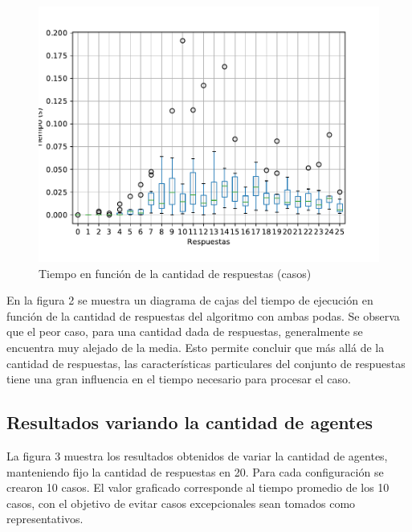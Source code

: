\documentclass{article}
\begin{document}
\begin{figure}[h]
\caption{Tiempo en función de la cantidad de respuestas (casos)}
\centering
\includegraphics[scale=0.5]{Respuestas_box_st.pdf}
\end{figure}

En la figura 2 se muestra un diagrama de cajas del tiempo de ejecución en función de la cantidad de respuestas del algoritmo con ambas podas. Se observa que el peor caso, para una cantidad dada de respuestas, generalmente se encuentra muy alejado de la media. Esto permite concluir que más allá de la cantidad de respuestas, las características particulares del conjunto de respuestas tiene una gran influencia en el tiempo necesario para procesar el caso.

\subsection{Resultados variando la cantidad de agentes}

La figura 3 muestra los resultados obtenidos de variar la cantidad de agentes, manteniendo fijo la cantidad de respuestas en 20. Para cada configuración se crearon 10 casos. El valor graficado corresponde al tiempo promedio de los 10 casos, con el objetivo de evitar casos excepcionales sean tomados como representativos.
\end{document}
